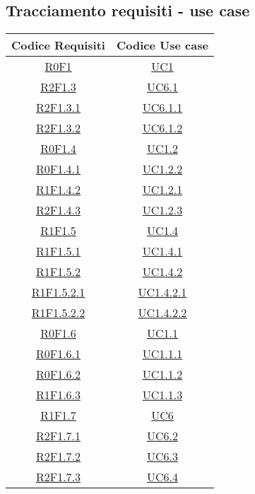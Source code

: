 \subsection{Tracciamento requisiti - use case}
\normalsize
\begin{longtable}{|c|c|}
\hline
\textbf{Codice Requisiti} & \textbf{Codice Use case} \\
\hline
\endhead
\hyperlink{R0F1}{R0F1} & \hyperlink{UC1}{UC1}\\
\hline
\hyperlink{R2F1.3}{R2F1.3} & \hyperlink{UC6.1}{UC6.1}\\
\hline
\hyperlink{R2F1.3.1}{R2F1.3.1} & \hyperlink{UC6.1.1}{UC6.1.1}\\
\hline
\hyperlink{R2F1.3.2}{R2F1.3.2} & \hyperlink{UC6.1.2}{UC6.1.2}\\
\hline
\hyperlink{R0F1.4}{R0F1.4} & \hyperlink{UC1.2}{UC1.2}\\
\hline
\hyperlink{R0F1.4.1}{R0F1.4.1} & \hyperlink{UC1.2.2}{UC1.2.2}\\
\hline
\hyperlink{R1F1.4.2}{R1F1.4.2} & \hyperlink{UC1.2.1}{UC1.2.1}\\
\hline
\hyperlink{R2F1.4.3}{R2F1.4.3} & \hyperlink{UC1.2.3}{UC1.2.3}\\
\hline
\hyperlink{R1F1.5}{R1F1.5} & \hyperlink{UC1.4}{UC1.4}\\
\hline
\hyperlink{R1F1.5.1}{R1F1.5.1} & \hyperlink{UC1.4.1}{UC1.4.1}\\
\hline
\hyperlink{R1F1.5.2}{R1F1.5.2} & \hyperlink{UC1.4.2}{UC1.4.2}\\
\hline
\hyperlink{R1F1.5.2.1}{R1F1.5.2.1} & \hyperlink{UC1.4.2.1}{UC1.4.2.1}\\
\hline
\hyperlink{R1F1.5.2.2}{R1F1.5.2.2} & \hyperlink{UC1.4.2.2}{UC1.4.2.2}\\
\hline
\hyperlink{R0F1.6}{R0F1.6} & \hyperlink{UC1.1}{UC1.1}\\
\hline
\hyperlink{R0F1.6.1}{R0F1.6.1} & \hyperlink{UC1.1.1}{UC1.1.1}\\
\hline
\hyperlink{R0F1.6.2}{R0F1.6.2} & \hyperlink{UC1.1.2}{UC1.1.2}\\
\hline
\hyperlink{R1F1.6.3}{R1F1.6.3} & \hyperlink{UC1.1.3}{UC1.1.3}\\
\hline
\hyperlink{R1F1.7}{R1F1.7} & \hyperlink{UC6}{UC6}\\
\hline
\hyperlink{R2F1.7.1}{R2F1.7.1} & \hyperlink{UC6.2}{UC6.2}\\
\hline
\hyperlink{R2F1.7.2}{R2F1.7.2} & \hyperlink{UC6.3}{UC6.3}\\
\hline
\hyperlink{R2F1.7.3}{R2F1.7.3} & \hyperlink{UC6.4}{UC6.4}\\

\end{longtable}
